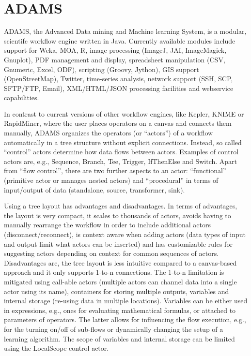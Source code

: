\documentclass{llncs}
\begin{document}
\section{ADAMS}
ADAMS, the Advanced Data mining and Machine learning System, is a modular,
scientifc workflow engine written in Java. Currently available modules
include support for Weka, MOA, R, image processing (ImageJ, JAI, ImageMagick,
Gnuplot), PDF management and display, spreadsheet manipulation (CSV,
Gnumeric, Excel, ODF), scripting (Groovy, Jython), GIS support
(OpenStreetMap), Twitter, time-series analysis, network support (SSH,
SCP, SFTP/FTP, Email), XML/HTML/JSON processing facilities and
webservice capabilities.

In contrast to current versions of other workflow engines, like Kepler, KNIME
or RapidMiner, where the user places operators on a canvas and connects them
manually, ADAMS organizes the operators (or “actors”) of a workflow
automatically in a tree structure without explicit connections. Instead, so
called “control” actors determine how data flows between actors. Examples of
control actors are, e.g., Sequence, Branch, Tee, Trigger, IfThenElse and
Switch. Apart from “flow control”, there are two further aspects to an actor:
“functional” (primitive actor or manages nested actors) and “procedural” in
terms of input/output of data (standalone, source, transformer, sink).

Using a tree layout has advantages and disadvantages. In terms of advantages,
the layout is very compact, it scales to thousands of actors, avoids
having to manually rearrange the workflow in order to include additional
actors (disconnect/reconnect), is context aware when adding actors (data
types of input and output limit what actors can be inserted) and has
customizable rules for suggesting actors depending on context for common
sequences of actors. Disadvantages are, the tree layout is less intuitive
compared to a canvas-based approach and it only supports 1-to-n connections.
The 1-to-n limitation is mitigated using call-able actors (multiple actors can
channel data into a single actor using its name), containers for storing
multiple outputs, variables and internal storage (re-using data in multiple
locations). Variables can be either used in expressions, e.g., ones for
evaluating mathematical formulas, or attached to parameters of operators. The
latter allows for influencing the flow execution, e.g., for the turning on/off
of sub-flows or dynamically changing the setup of a learning algorithm. The
scope of variables and internal storage can be limited using the LocalScope
control actor.
\end{document}
